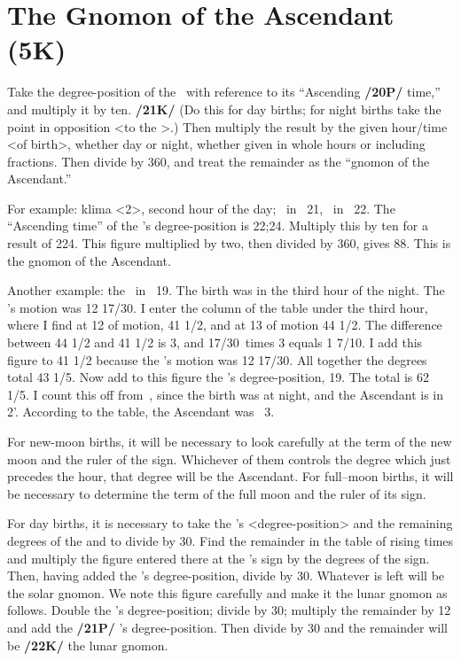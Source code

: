 \section{The Gnomon of the Ascendant (5K)}

Take the degree-position of the \Sun\, with reference to its “Ascending \textbf{/20P/} time,” and multiply it by ten. \textbf{/21K/} (Do this for day births; for night births take the point in opposition <to the \Sun>.) Then multiply the result by the given hour/time <of birth>, whether day or night, whether given in whole hours or including fractions. Then divide by 360, and treat the remainder as the “gnomon of the Ascendant.”

For example: klima <2>, second hour of the day; \Sun\, in \Cancer\, 21\deg, \Moon\, in \Aries\, 22\deg. The “Ascending time” of the \Sun’s degree-position is 22;24. Multiply this by ten for a result of 224. This figure multiplied by two, then divided by 360\deg, gives 88. This is the gnomon of the Ascendant.

Another example: the \Sun\, in \Capricorn\, 19\deg. The birth was in the third hour of the night. The \Moon’s motion was 12 17/30\deg. I enter the column of the table under the third hour, where I find at 12 of motion, 41 1/2, and at 13 of motion 44 1/2. The difference between 44 1/2 and 41 1/2 is 3, and 17/30\deg\, times 3 equals 1 7/10\deg. I add this figure to 41 1/2 because the \Moon’s motion was 12 17/30\deg. All
together the degrees total 43 1/5. Now add to this figure the \Sun’s degree-position, 19\deg. The total is 62 1/5\deg. I count this off from \Cancer\,, since the birth was at night, and the Ascendant is in \Virgo\, 2'.
According to the table, the Ascendant was \Virgo\, 3\deg.

For new-moon births, it will be necessary to look carefully at the term of the new moon and the ruler of the sign. Whichever of them controls the degree which just precedes the hour, that degree will be the Ascendant. For full–moon births, it will be necessary to determine the term of the full moon and the ruler
of its sign.

For day births, it is necessary to take the \Sun’s <degree-position> and the remaining degrees of the \Moon and to divide by 30. Find the remainder in the table of rising times and multiply the figure entered there at the \Sun’s sign by the degrees of the sign. Then, having added the \Sun’s degree-position, divide by 30. Whatever is left will be the solar gnomon. We note this figure carefully and make it the lunar gnomon as follows. Double the \Moon’s degree-position; divide by 30; multiply the remainder by 12 and add the \textbf{/21P/} \Moon’s degree-position. Then divide by 30 and the remainder will be \textbf{/22K/} the lunar gnomon.


